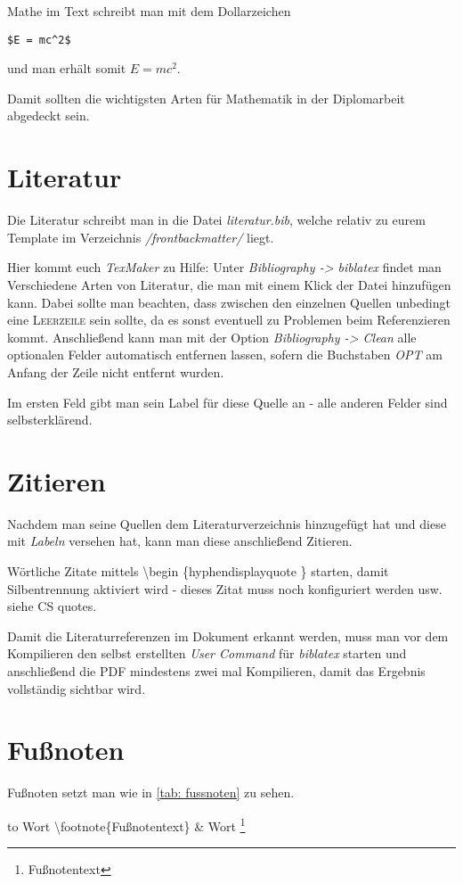 Mathe im Text schreibt man mit dem Dollarzeichen
\begin{lstlisting}
$E = mc^2$
\end{lstlisting}
und man erhält somit $E=mc^2$.

Damit sollten die wichtigsten Arten für Mathematik in der Diplomarbeit abgedeckt sein.
%
%
\section{Literatur}%
Die Literatur schreibt man in die Datei \emph{literatur.bib}, welche relativ zu eurem Template im Verzeichnis \emph{/frontbackmatter/} liegt.%

Hier kommt euch \emph{TexMaker} zu Hilfe: Unter \emph{Bibliography -> biblatex} findet man Verschiedene Arten von Literatur, die man mit einem Klick der Datei hinzufügen kann. Dabei sollte man beachten, dass zwischen den einzelnen Quellen unbedingt eine \textsc{Leerzeile} sein sollte, da es sonst eventuell zu Problemen beim Referenzieren kommt. Anschließend kann man mit der Option \emph{Bibliography -> Clean} alle optionalen Felder automatisch entfernen lassen, sofern die Buchstaben \emph{OPT} am Anfang der Zeile nicht entfernt wurden.%

Im ersten Feld gibt man sein Label für diese Quelle an - alle anderen Felder sind selbsterklärend.%
%
%
\section{Zitieren}%
Nachdem man seine Quellen dem Literaturverzeichnis hinzugefügt hat und diese mit \emph{Labeln} versehen hat, kann man diese anschließend Zitieren.%

Wörtliche Zitate mittels \textbackslash begin  \{hyphendisplayquote \} starten, damit Silbentrennung aktiviert wird - dieses Zitat muss noch konfiguriert werden usw. siehe CS quotes.%

Damit die Literaturreferenzen im Dokument erkannt werden, muss man vor dem Kompilieren den selbst erstellten \emph{User Command} für \emph{biblatex} starten und anschließend die PDF mindestens zwei mal Kompilieren, damit das Ergebnis vollständig sichtbar wird.%
%
%
\section{Fußnoten}%
Fußnoten setzt man wie in \ref{tab: fussnoten} zu sehen.\\%
\begin{table}[h]%
\begin{tabu} to \textwidth {X[c]X[c]}%
\toprule%
Wort \textbackslash footnote\{Fußnotentext\} & Wort \footnote{Fußnotentext} \\%
\bottomrule%
\end{tabu}%
\caption{Fußnoten}%
\label{tab: fussnoten}%
\end{table}%
%
%
